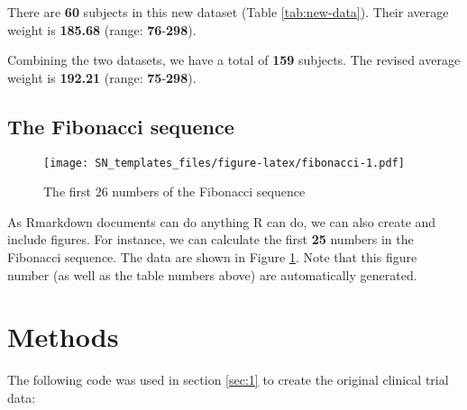 \documentclass[smallextended]{svjour3}       %
\begin{document}
There are \textbf{60} subjects in this new dataset (Table \ref{tab:new-data}). Their average weight is \textbf{185.68} (range: \textbf{76}-\textbf{298}).

Combining the two datasets, we have a total of \textbf{159} subjects. The revised average weight is \textbf{192.21} (range: \textbf{75}-\textbf{298}).

\hypertarget{sec:2}{%
\subsection{The Fibonacci sequence}\label{sec:2}}

\begin{figure}
\centering
\texttt{[image: SN\_templates\_files/figure-latex/fibonacci-1.pdf]}
\caption{\label{fig:fibonacci}The first 26 numbers of the Fibonacci sequence}
\end{figure}

As Rmarkdown documents can do anything R can do, we can also create and include figures. For instance, we can calculate the first \textbf{25} numbers in the Fibonacci sequence. The data are shown in Figure \ref{fig:fibonacci}. Note that this figure number (as well as the table numbers above) are automatically generated.

\hypertarget{methods}{%
\section{Methods}\label{methods}}

The following code was used in section \ref{sec:1} to create the original clinical trial data:
\end{document}
